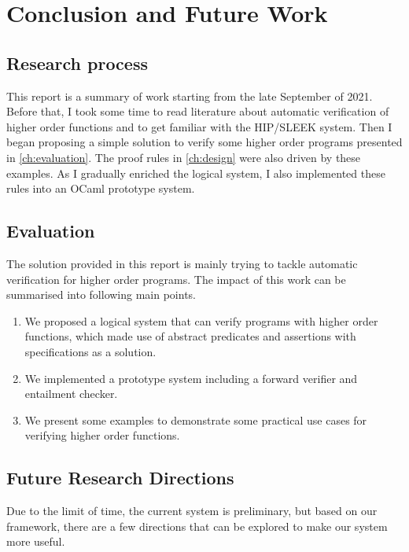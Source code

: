\chapter{Conclusion and Future Work}
\label{ch:concl}

\section{Research process}

This report is a summary of work starting from the late September of 2021. Before that, I took some time to read literature about automatic verification of higher order functions and to get familiar with the HIP/SLEEK system. Then I began proposing a simple solution to verify some higher order programs presented in \autoref{ch:evaluation}. The proof rules in \autoref{ch:design} were also driven by these examples. As I gradually enriched the logical system, I also implemented these rules into an OCaml prototype system.

\section{Evaluation}

The solution provided in this report is mainly trying to tackle automatic verification for higher order programs. The impact of this work can be summarised into following main points.

\begin{enumerate}
    \item We proposed a logical system that can verify programs with higher order functions, which made use of abstract predicates and assertions with specifications as a solution.
    \item We implemented a prototype system including a forward verifier and entailment checker.
    \item We present some examples to demonstrate some practical use cases for verifying higher order functions.
\end{enumerate}

\section{Future Research Directions}

Due to the limit of time, the current system is preliminary, but based on our framework, there are a few directions that can be explored to make our system more useful.

